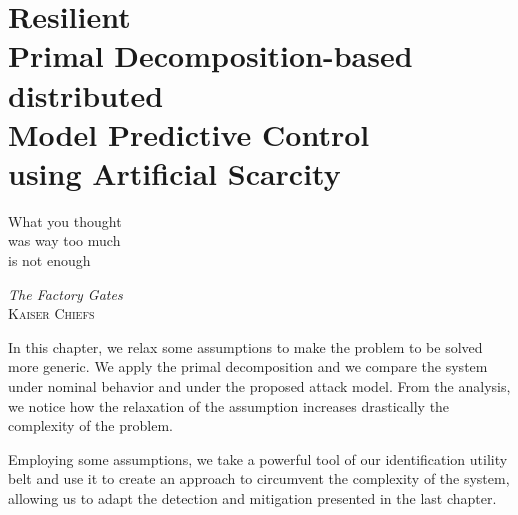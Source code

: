 \documentclass[../main.tex]{subfiles}
\begin{document}
\chapter[Resilient Primal Decomposition-based dMPC using Artificial Scarcity]{Resilient \\Primal Decomposition-based \\distributed \\Model Predictive Control\\using Artificial Scarcity}\label{sec:safe_pddmpc_ineq}
\epigraph{\centering What you thought\\ was way too much\\ is not enough}
{\textit{The Factory Gates}\\\textsc{Kaiser Chiefs}}

In this chapter, we relax some assumptions to make the problem to be solved more generic.
We apply the primal decomposition and we compare the system under nominal behavior and under the proposed attack model.
From the analysis, we notice how the relaxation of the assumption increases drastically the complexity of the problem.

Employing some assumptions, we take a powerful tool of our identification utility belt and use it to create an approach to circumvent the complexity of the system, allowing us to adapt the detection and mitigation presented in the last chapter.

\minitoc
\end{document}
